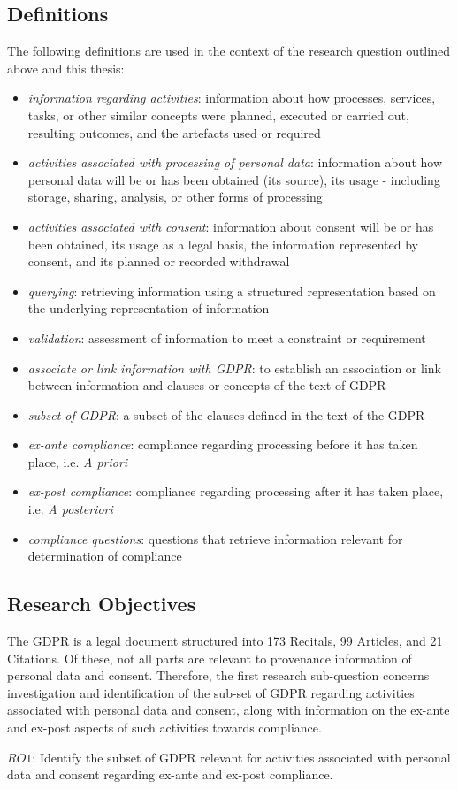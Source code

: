 \subsection{Definitions}\label{sec:intro:definitions}
The following definitions are used in the context of the research question outlined above and this thesis:
\begin{itemize}
    \item \textit{information regarding activities}: information about how processes, services, tasks, or other similar concepts were planned, executed or carried out, resulting outcomes, and the artefacts used or required
    \item \textit{activities associated with processing of personal data}: information about how personal data will be or has been obtained (its source), its usage - including storage, sharing, analysis, or other forms of processing 
    \item \textit{activities associated with consent}: information about consent will be or has been obtained, its usage as a legal basis, the information represented by consent, and its planned or recorded withdrawal
    \item \textit{querying}: retrieving information using a structured representation based on the underlying representation of information
    \item \textit{validation}: assessment of information to meet a constraint or requirement
    \item \textit{associate or link information with GDPR}: to establish an association or link between information and clauses or concepts of the text of GDPR
    \item \textit{subset of GDPR}: a subset of the clauses defined in the text of the GDPR
    \item \textit{ex-ante compliance}: compliance regarding processing before it has taken place, i.e. \textit{A priori}
    \item \textit{ex-post compliance}: compliance regarding processing after it has taken place, i.e. \textit{A posteriori}
    \item \textit{compliance questions}: questions that retrieve information relevant for determination of compliance
\end{itemize}

\subsection{Research Objectives}\label{sec:intro:RO}
The GDPR is a legal document structured into 173 Recitals, 99 Articles, and 21 Citations. Of these, not all parts are relevant to provenance information of personal data and consent. Therefore, the first research sub-question concerns investigation and identification of the sub-set of GDPR regarding activities associated with personal data and consent, along with information on the ex-ante and ex-post aspects of such activities towards compliance.
\begin{framed}
$RO1$: Identify the subset of GDPR relevant for activities associated with personal data and consent regarding ex-ante and ex-post compliance.
\end{framed}

